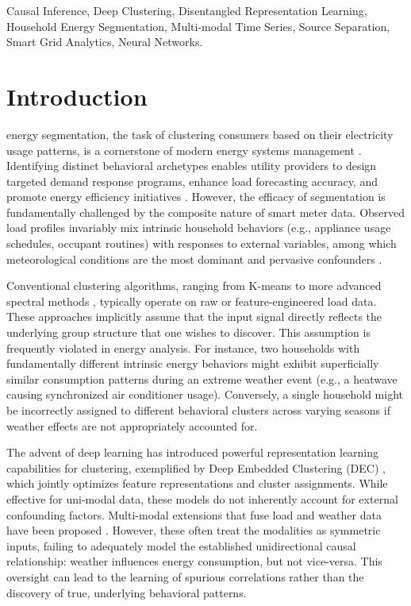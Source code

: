 \documentclass[journal]{IEEEtran}
\begin{document}
\begin{IEEEkeywords}
Causal Inference, Deep Clustering, Disentangled Representation Learning, Household Energy Segmentation, Multi-modal Time Series, Source Separation, Smart Grid Analytics, Neural Networks.
\end{IEEEkeywords}

\section{Introduction}
 energy segmentation, the task of clustering consumers based on their electricity usage patterns, is a cornerstone of modern energy systems management \cite{smart_grid_review}. Identifying distinct behavioral archetypes enables utility providers to design targeted demand response programs, enhance load forecasting accuracy, and promote energy efficiency initiatives \cite{demand_response_survey}. However, the efficacy of segmentation is fundamentally challenged by the composite nature of smart meter data. Observed load profiles invariably mix intrinsic household behaviors (e.g., appliance usage schedules, occupant routines) with responses to external variables, among which meteorological conditions are the most dominant and pervasive confounders \cite{weather_normalization_energy}.

Conventional clustering algorithms, ranging from K-means \cite{kmeans_clustering} to more advanced spectral methods \cite{spectral_clustering}, typically operate on raw or feature-engineered load data. These approaches implicitly assume that the input signal directly reflects the underlying group structure that one wishes to discover. This assumption is frequently violated in energy analysis. For instance, two households with fundamentally different intrinsic energy behaviors might exhibit superficially similar consumption patterns during an extreme weather event (e.g., a heatwave causing synchronized air conditioner usage). Conversely, a single household might be incorrectly assigned to different behavioral clusters across varying seasons if weather effects are not appropriately accounted for.

The advent of deep learning has introduced powerful representation learning capabilities for clustering, exemplified by Deep Embedded Clustering (DEC) \cite{deep_embedding_clustering_xie}, which jointly optimizes feature representations and cluster assignments. While effective for uni-modal data, these models do not inherently account for external confounding factors. Multi-modal extensions that fuse load and weather data have been proposed \cite{multi_modal_deep_learning_survey}. However, these often treat the modalities as symmetric inputs, failing to adequately model the established unidirectional causal relationship: weather influences energy consumption, but not vice-versa. This oversight can lead to the learning of spurious correlations rather than the discovery of true, underlying behavioral patterns.
\end{document}
